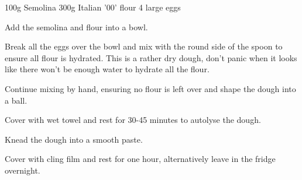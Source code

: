 \label{rec:egg-pasta}

\begin{ingreds}
	100g Semolina
	300g Italian '00' flour
	4 large eggs 

\end{ingreds}

\begin{method}		
     	Add the semolina and flour into a bowl.

	Break all the eggs over the bowl and mix with the round side of the spoon to ensure all flour is hydrated.  This is a rather dry dough, don't panic when it looks like there won't be enough water to hydrate all the flour.

	Continue mixing by hand, ensuring no flour is left over and shape the dough into a ball.

	Cover with wet towel and rest for 30-45 minutes to autolyse the dough.

	Knead the dough into a smooth paste.

	Cover with cling film and rest for one hour, alternatively leave in the fridge overnight.

\end {method}
